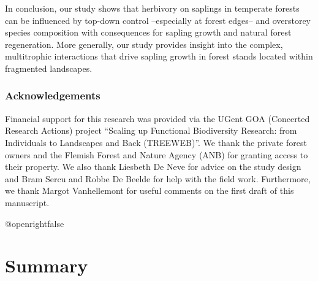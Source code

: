 \documentclass[b5paper,10pt]{book} %
\newlength{\thumbheight}
\newlength{\thumbwidth}
\begin{document}
	\medskip

In conclusion, our study shows that herbivory on saplings in temperate forests can be influenced by top-down control --especially at forest edges-- and overstorey species composition with consequences for sapling growth and natural forest regeneration. More generally, our study provides insight into the complex, multitrophic interactions that drive sapling growth in forest stands located within fragmented landscapes.


	\medskip


	\subsection*{Acknowledgements}

	\begin{footnotesize}
	Financial support for this research was provided via the UGent GOA (Concerted Research Actions) project “Scaling up Functional Biodiversity Research: from Individuals to Landscapes and Back (TREEWEB)”. We thank the private forest owners and the Flemish Forest and Nature Agency (ANB) for granting access to their property. We also thank Liesbeth De Neve for advice on the study design and Bram Sercu and Robbe De Beelde for help with the field work. Furthermore, we thank Margot Vanhellemont for useful comments on the first draft of this manuscript.
	\end{footnotesize}






\appendix
\setlength{\thumbwidth}{0cm}
\setlength{\thumbheight}{0cm}




	\csname @openrightfalse\endcsname	
	\clearpage
	\thispagestyle{plain} %
	\backmatter
	\newpage{\thispagestyle{empty}\cleardoublepage}
	\ClearWallPaper
	\chapter{Summary} 
	
\end{document}
